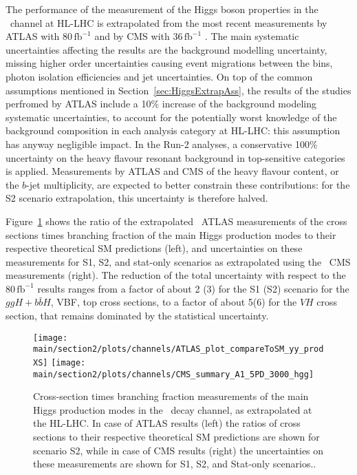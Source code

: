 The performance of the measurement of the Higgs boson properties in the \Hyy\ channel at HL-LHC is extrapolated from the most recent measurements by ATLAS with 80\,$\mathrm{fb}^{-1}$ \cite{ATLAS:2018uso} and by CMS with 36\,$\mathrm{fb}^{-1}$ \cite{Sirunyan:2018ouh}. The main systematic uncertainties affecting the results are the background modelling uncertainty,
missing higher order uncertainties
causing event migrations between the bins, photon isolation efficiencies and jet uncertainties.
%
On top of the common assumptions mentioned in Section~\ref{sec:HiggsExtrapAss}, the %
results of the studies perfromed by ATLAS include a 10\% increase of the background modeling systematic uncertainties, to account for the potentially worst knowledge of the background composition in each analysis category at HL-LHC: this assumption has anyway negligible impact.
%
In the Run-2 analyses, a conservative 100\% uncertainty on the heavy flavour resonant background in top-sensitive categories is applied. Measurements by ATLAS and CMS of the heavy flavour content, or the $b$-jet multiplicity, are expected to better constrain these contributions: for the S2 scenario extrapolation, this uncertainty is therefore halved.

Figure~\ref{fig:Hyy_ATLAS_HLLHC_S2} shows the ratio of the extrapolated \Hyy\ ATLAS measurements of the cross sections times branching fraction of the main Higgs production modes to their respective theoretical SM predictions (left), and uncertainties on these measurements for S1, S2, and stat-only scenarios as extrapolated using the \HZZ\ CMS measurements (right). The reduction of the total uncertainty with respect to the 80\,$\mathrm{fb}^{-1}$ results ranges from a factor of about 2 (3) for the S1 (S2) scenario for the $ggH+b\bar{b}H$, VBF, top cross sections, to a factor of about 5(6) for the $VH$ cross section, that remains dominated by the statistical uncertainty.

\begin{figure}
  \centering
  \texttt{[image: \\main/section2/plots/channels/ATLAS\_plot\_compareToSM\_yy\_prodXS]}
  \texttt{[image: \\main/section2/plots/channels/CMS\_summary\_A1\_5PD\_3000\_hgg]}
  \caption{Cross-section times branching fraction measurements of the main Higgs production modes in the \Hyy\ decay channel, as extrapolated at the HL-LHC. In case of ATLAS results (left) the ratios of cross sections to their respective theoretical SM predictions are shown for scenario S2, while in case of CMS results (right) the uncertainties on these measurements are shown for S1, S2, and Stat-only scenarios..}
  \label{fig:Hyy_ATLAS_HLLHC_S2}
\end{figure}

